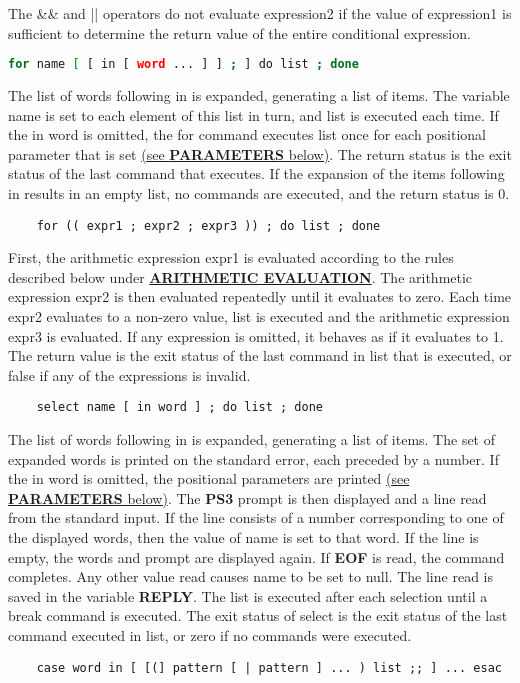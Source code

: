 The \&\& and || operators do not evaluate expression2 if the value of expression1 is sufficient to determine the return value of the entire conditional expression.
\begin{lstlisting}[language=bash]
    for name [ [ in [ word ... ] ] ; ] do list ; done
\end{lstlisting}
The list of words following in is expanded, generating a list of items. The variable name is set to each element of this list in turn, and list is executed each time. If the in word is omitted, the for command executes list once for each positional parameter that is set \hyperref[sec:parameters]{(see \textbf{PARAMETERS} below)}. The return status is the exit status of the last command that executes. If the expansion of the items following in results in an empty list, no commands are executed, and the return status is 0.
\begin{lstlisting}
    for (( expr1 ; expr2 ; expr3 )) ; do list ; done
\end{lstlisting}
First, the arithmetic expression expr1 is evaluated according to the rules described below under \hyperref[sec:arithmeticevaluation]{\textbf{ARITHMETIC EVALUATION}}. The arithmetic expression expr2 is then evaluated repeatedly until it evaluates to zero. Each time expr2 evaluates to a non-zero value, list is executed and the arithmetic expression expr3 is evaluated. If any expression is omitted, it behaves as if it evaluates to 1. The return value is the exit status of the last command in list that is executed, or false if any of the expressions is invalid.
\begin{lstlisting}
    select name [ in word ] ; do list ; done
\end{lstlisting}
The list of words following in is expanded, generating a list of items. The set of expanded words is printed on the standard error, each preceded by a number. If the in word is omitted, the positional parameters are printed \hyperref[sec:parameters]{(see \textbf{PARAMETERS} below)}. The \textbf{PS3} prompt is then displayed and a line read from the standard input. If the line consists of a number corresponding to one of the displayed words, then the value of name is set to that word. If the line is empty, the words and prompt are displayed again. If \textbf{EOF} is read, the command completes. Any other value read causes name to be set to null. The line read is saved in the variable \textbf{REPLY}. The list is executed after each selection until a break command is executed. The exit status of select is the exit status of the last command executed in list, or zero if no commands were executed.
\begin{lstlisting}
    case word in [ [(] pattern [ | pattern ] ... ) list ;; ] ... esac
\end{lstlisting}

